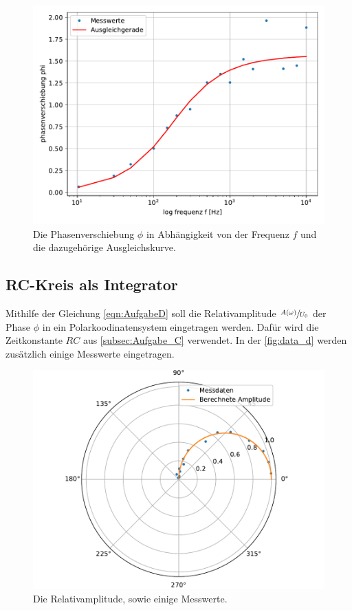 \begin{figure}
  \centering
  \includegraphics{content/data_c_ausgleich.pdf}
  \caption{Die Phasenverschiebung $\phi$ in Abhängigkeit von der Frequenz $f$ und die dazugehörige Ausgleichskurve.}
  \label{fig:data_c}
\end{figure}

\subsection{RC-Kreis als Integrator}
\label{Aufgabe_d}
Mithilfe der Gleichung \eqref{eqn:AufgabeD} soll die Relativamplitude $\sfrac{A(\omega)}{U_0}$ der Phase $\phi$ in ein Polarkoodinatensystem eingetragen werden.
Dafür wird die Zeitkonstante $RC$ aus \autoref{subsec:Aufgabe_C} verwendet.
In der \autoref{fig:data_d} werden zusätzlich einige Messwerte eingetragen.

\begin{figure}
  \centering
  \includegraphics{content/data_d_ausgleich.pdf}
  \caption{Die Relativamplitude, sowie einige Messwerte.}
  \label{fig:data_d}
\end{figure}

